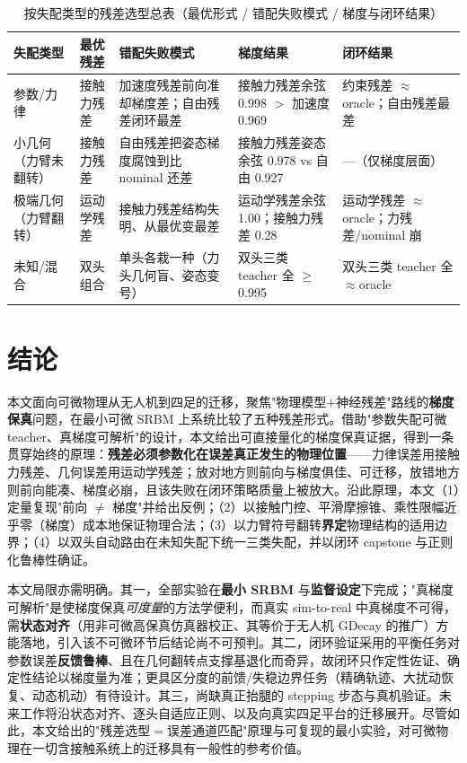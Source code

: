 \documentclass[zihao=5, a4paper]{ctexart}
\begin{document}
\begin{table}[htbp]
  \centering
  \caption{按失配类型的残差选型总表（最优形式 / 错配失败模式 / 梯度与闭环结果）}
  \label{tab:summary}
  \small\setlength{\tabcolsep}{4pt}
  \renewcommand{\arraystretch}{1.15}
  \begin{tabular}{p{2.4cm}p{2.5cm}p{3.4cm}p{3.0cm}p{3.0cm}}
    \toprule
    失配类型 & 最优残差 & 错配失败模式 & 梯度结果 & 闭环结果 \\
    \midrule
    参数/力律 & 接触力残差 & 加速度残差前向准却梯度差；自由残差闭环最差 & 接触力残差余弦 0.998 $>$ 加速度 0.969 & 约束残差 $\approx$oracle；自由残差最差 \\
    小几何（力臂未翻转）& 接触力残差 & 自由残差把姿态梯度腐蚀到比 nominal 还差 & 接触力残差姿态余弦 0.978 vs 自由 0.927 & ---（仅梯度层面）\\
    极端几何（力臂翻转）& 运动学残差 & 接触力残差结构失明、从最优变最差 & 运动学残差余弦 1.00；接触力残差 0.28 & 运动学残差 $\approx$oracle；力残差/nominal 崩 \\
    未知/混合 & 双头组合 & 单头各栽一种（力头几何盲、姿态变号）& 双头三类 teacher 全 $\ge$0.995 & 双头三类 teacher 全 $\approx$oracle \\
    \bottomrule
  \end{tabular}
\end{table}

\FloatBarrier
\section{结论}

本文面向可微物理从无人机到四足的迁移，聚焦"物理模型$+$神经残差"路线的\textbf{梯度保真}问题，在最小可微 SRBM 上系统比较了五种残差形式。借助"参数失配可微 teacher、真梯度可解析"的设计，本文给出可直接量化的梯度保真证据，得到一条贯穿始终的原理：\textbf{残差必须参数化在误差真正发生的物理位置}——力律误差用接触力残差、几何误差用运动学残差；放对地方则前向与梯度俱佳、可迁移，放错地方则前向能凑、梯度必崩，且该失败在闭环策略质量上被放大。沿此原理，本文（1）定量复现"前向 $\neq$ 梯度"并给出反例；（2）以接触门控、平滑摩擦锥、乘性限幅近乎零（梯度）成本地保证物理合法；（3）以力臂符号翻转\textbf{界定}物理结构的适用边界；（4）以双头自动路由在未知失配下统一三类失配，并以闭环 capstone 与正则化鲁棒性确证。

本文局限亦需明确。其一，全部实验在\textbf{最小 SRBM} 与\textbf{监督设定}下完成；"真梯度可解析"是使梯度保真\emph{可度量}的方法学便利，而真实 sim-to-real 中真梯度不可得，需\textbf{状态对齐}（用非可微高保真仿真器校正、其等价于无人机 GDecay 的推广）方能落地，引入该不可微环节后结论尚不可预判。其二，闭环验证采用的平衡任务对参数误差\textbf{反馈鲁棒}、且在几何翻转点支撑基退化而奇异，故闭环只作定性佐证、确定性结论以梯度量为准；更具区分度的前馈/失稳边界任务（精确轨迹、大扰动恢复、动态机动）有待设计。其三，尚缺真正抬腿的 stepping 步态与真机验证。未来工作将沿状态对齐、逐头自适应正则、以及向真实四足平台的迁移展开。尽管如此，本文给出的"残差选型$=$误差通道匹配"原理与可复现的最小实验，对可微物理在一切含接触系统上的迁移具有一般性的参考价值。
\end{document}
